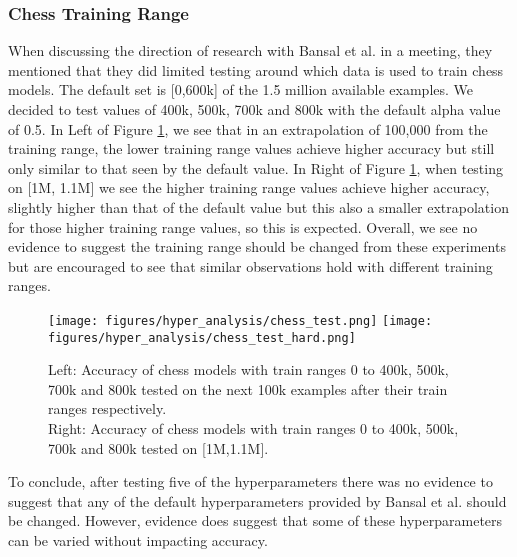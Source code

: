 \subsubsection{Chess Training Range}
When discussing the direction of research with Bansal et al. in a meeting, they mentioned that they did limited testing around which data is used to train chess models. The default set is [0,600k] of the 1.5 million available examples. We decided to test values of 400k, 500k, 700k and 800k with the default alpha value of 0.5. In Left of Figure \ref{figs:chesstrainrange}, we see that in an extrapolation of 100,000 from the training range, the lower training range values achieve higher accuracy but still only similar to that seen by the default value. In Right of Figure \ref{figs:chesstrainrange}, when testing on [1M, 1.1M] we see the higher training range values achieve higher accuracy, slightly higher than that of the default value but this also a smaller extrapolation for those higher training range values, so this is expected. Overall, we see no evidence to suggest the training range should be changed from these experiments but are encouraged to see that similar observations hold with different training ranges.

\begin{figure}[h]
    \texttt{[image: figures/hyper\_analysis/chess\_test.png]}\hfill
    \texttt{[image: figures/hyper\_analysis/chess\_test\_hard.png]}
    \caption{
    Left: Accuracy of chess models with train ranges 0 to 400k, 500k, 700k and 800k tested on the next 100k examples after their train ranges respectively. \\
    Right: Accuracy of chess models with train ranges 0 to 400k, 500k, 700k and 800k tested on [1M,1.1M].}
    \label{figs:chesstrainrange}
\end{figure}

To conclude, after testing five of the hyperparameters there was no evidence to suggest that any of the default hyperparameters provided by Bansal et al. should be changed. However, evidence does suggest that some of these hyperparameters can be varied without impacting accuracy.